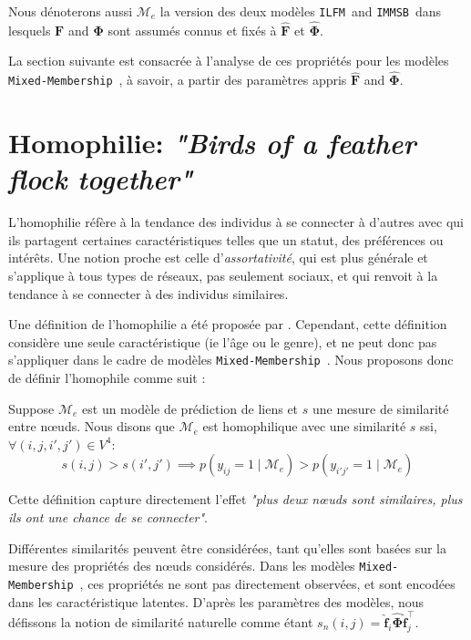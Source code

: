 \documentclass[french]{hermes-journal}
\newcommand{\ilfm}{\texttt{ILFM}}
\newcommand{\immsb}{\texttt{IMMSB}}
\newcommand{\mmm}{\texttt{Mixed-Membership}~}
\newcommand{\pr}{p}
\newcommand{\mat}[1]{\bm{#1}}
\begin{document}
Nous dénoterons aussi $\mathcal{M}_e$ la version des deux modèles \ilfm\ and \immsb\ dans lesquels $\mat{F}$ and $\mat{\Phi}$ sont assumés connus et fixés à $\mat{\hat{F}}$ et  $\mat{\hat{\Phi}}$.

La section suivante est consacrée à l'analyse  de ces propriétés pour les modèles \mmm, à savoir, a partir des paramètres appris $\mat{\hat{F}}$ and $\mat{\hat{\Phi}}$.


\section{Homophilie: \emph{"Birds of a feather flock together"}}
\label{sec:homophily}

L'homophilie réfère à la tendance des individus à se connecter à d'autres avec qui ils partagent certaines caractéristiques telles que un statut, des préférences ou intérêts\cite{mcpherson2001birds,lazarsfeld1954friendship}.   Une notion proche est celle d'\emph{assortativité}, qui est plus générale et s'applique à tous types de réseaux, pas seulement sociaux, et qui renvoit à la tendance à se connecter à des individus similaires.


Une définition de l'homophilie a été proposée par \cite{la2010randomization}. Cependant, cette définition considère une seule caractéristique (ie l'âge ou le genre), et ne peut donc pas s'appliquer dans le cadre de modèles \mmm. Nous proposons donc de définir l'homophile comme suit : 
\begin{definition}[Homophilie] \label{def:homophily}
    Suppose $\mathcal{M}_e$ est un modèle de prédiction de liens et $s$ une mesure de similarité entre n\oe{}uds. Nous disons que $\mathcal{M}_e$ est homophilique avec une similarité $s$ ssi, $\forall (i,j,i',j') \in V^4$:
\begin{equation}
s(i,j) > s(i',j')  \implies \pr(y_{ij}=1 \mid \mathcal{M}_e) > \pr(y_{i'j'}=1  \mid \mathcal{M}_e) \nonumber
\end{equation}

\end{definition}

\noindent Cette définition capture directement l'effet \emph{"plus deux n\oe{}uds sont similaires, plus ils ont une chance de se connecter"}. 

Différentes similarités peuvent être considérées, tant qu'elles sont basées sur la mesure des propriétés des n\oe{}uds considérés. Dans les modèles \mmm, ces propriétés ne sont pas directement observées, et sont encodées dans les caractéristique latentes. D'après les paramètres des modèles, nous défissons la notion de similarité naturelle comme étant $s_n(i,j) = \mat{\hat{f}}_{i} \mat{\hat{\Phi}} \mat{\hat{f}}_j^\top$.
\end{document}
